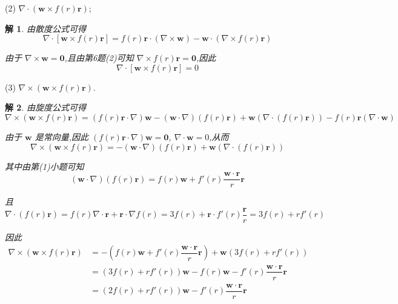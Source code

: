 \documentclass[a4paper,12pt]{article}
\newtheorem*{sol}{解}
\begin{document}
(2) $\nabla \cdot \left(\boldsymbol{w} \times f(r)\boldsymbol{r}\right)$;
\begin{sol}
    由散度公式可得
    $$\nabla\cdot[\boldsymbol{w} \times f(r)\boldsymbol{r}]=f(r)\boldsymbol{r}\cdot(\nabla\times\boldsymbol{w})-\boldsymbol{w}\cdot(\nabla\times f(r)\boldsymbol{r})$$

    由于 $\nabla\times\boldsymbol{w}=\boldsymbol{0}$,且由第6题(2)可知 $\nabla\times f(r)\boldsymbol{r}=\boldsymbol{0}$,因此
    $$\nabla\cdot[\boldsymbol{w} \times f(r)\boldsymbol{r}]=0$$
\end{sol}

(3) $\nabla \times \left(\boldsymbol{w} \times f(r)\boldsymbol{r}\right)$.
\begin{sol}
    由旋度公式可得
    $$\nabla\times(\boldsymbol{w}\times f(r)\boldsymbol{r})=(f(r)\boldsymbol{r}\cdot\nabla)\boldsymbol{w}-(\boldsymbol{w}\cdot\nabla)(f(r)\boldsymbol{r})+\boldsymbol{w}(\nabla\cdot(f(r)\boldsymbol{r}))-f(r)\boldsymbol{r}(\nabla\cdot\boldsymbol{w})$$

    由于 $\boldsymbol{w}$ 是常向量,因此 $(f(r)\boldsymbol{r}\cdot\nabla)\boldsymbol{w}=\boldsymbol{0}$, $\nabla\cdot\boldsymbol{w}=0$,从而
    $$\nabla\times(\boldsymbol{w}\times f(r)\boldsymbol{r})=-(\boldsymbol{w}\cdot\nabla)(f(r)\boldsymbol{r})+\boldsymbol{w}(\nabla\cdot(f(r)\boldsymbol{r}))$$

    其中由第(1)小题可知
    $$(\boldsymbol{w}\cdot\nabla)(f(r)\boldsymbol{r})=f(r)\boldsymbol{w}+f'(r)\dfrac{\boldsymbol{w}\cdot\boldsymbol{r}}{r}\boldsymbol{r}$$

    且
    $$\nabla\cdot(f(r)\boldsymbol{r})=f(r)\nabla\cdot\boldsymbol{r}+\boldsymbol{r}\cdot\nabla f(r)=3f(r)+\boldsymbol{r}\cdot f'(r)\dfrac{\boldsymbol{r}}{r}=3f(r)+rf'(r)$$

    因此
    $$\begin{aligned}
        \nabla\times(\boldsymbol{w}\times f(r)\boldsymbol{r})
        &=-(f(r)\boldsymbol{w}+f'(r)\dfrac{\boldsymbol{w}\cdot\boldsymbol{r}}{r}\boldsymbol{r})+\boldsymbol{w}(3f(r)+rf'(r)) \\
        &=(3f(r)+rf'(r))\boldsymbol{w}-f(r)\boldsymbol{w}-f'(r)\dfrac{\boldsymbol{w}\cdot\boldsymbol{r}}{r}\boldsymbol{r} \\
        &=(2f(r)+rf'(r))\boldsymbol{w}-f'(r)\dfrac{\boldsymbol{w}\cdot\boldsymbol{r}}{r}\boldsymbol{r}
    \end{aligned}$$
\end{sol}
\end{document}
